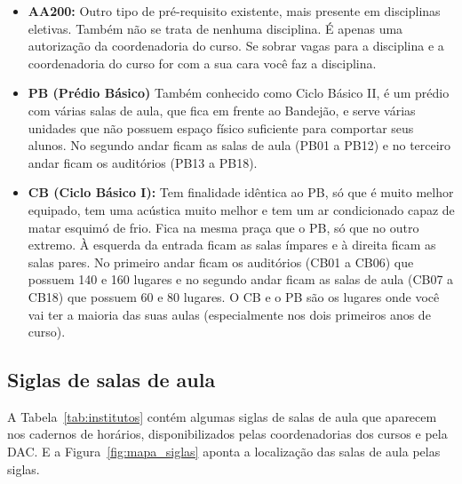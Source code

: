 \begin{itemize}
    \item  \textbf{AA200:} Outro tipo de pré-requisito existente, mais presente
        em disciplinas eletivas. Também não se trata de nenhuma disciplina. É
        apenas uma autorização da coordenadoria do curso. Se sobrar vagas para a
        disciplina e a coordenadoria do curso for com a sua cara você faz a
        disciplina.

    \item  \textbf{PB (Prédio Básico)} Também conhecido como Ciclo Básico II, é
        um prédio com várias salas de aula, que fica em frente ao Bandejão, e
        serve várias unidades que não possuem espaço físico suficiente para
        comportar seus alunos. No segundo andar ficam as salas de aula (PB01 a
        PB12) e no terceiro andar ficam os auditórios (PB13 a PB18).

    \item  \textbf{CB (Ciclo Básico I):} Tem finalidade idêntica ao PB, só que é
        muito melhor equipado, tem uma acústica muito melhor e tem um ar
        condicionado capaz de matar esquimó de frio. Fica na mesma praça que o
        PB, só que no outro extremo. À esquerda da entrada ficam as salas
        ímpares e à direita ficam as salas pares. No primeiro andar ficam os
        auditórios (CB01 a CB06) que possuem 140 e 160 lugares e no segundo
        andar ficam as salas de aula (CB07 a CB18) que possuem 60 e 80 lugares.
        O CB e o PB são os lugares onde você vai ter a maioria das suas aulas
        (especialmente nos dois primeiros anos de curso).
\end{itemize}

\subsection{Siglas de salas de aula}

A Tabela~\ref{tab:institutos} contém algumas siglas de salas de aula que
aparecem nos cadernos de horários, disponibilizados pelas coordenadorias dos
cursos e pela DAC. E a Figura~\ref{fig:mapa_siglas} aponta a localização das
salas de aula pelas siglas.

